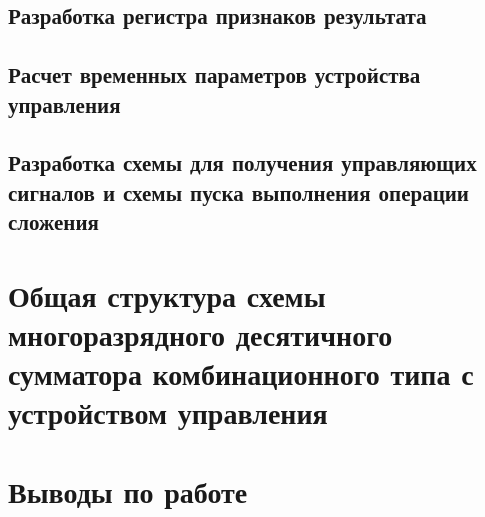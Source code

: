 \documentclass[a4paper,14pt]{article}
\begin{document}
\subsection{Разработка регистра признаков результата}

\subsection{Расчет временных параметров устройства управления}

\subsection{Разработка схемы для получения управляющих сигналов и схемы пуска выполнения операции сложения}

\section{Общая структура схемы многоразрядного десятичного сумматора комбинационного типа с устройством управления}

\section{Выводы по работе}
\end{document}
